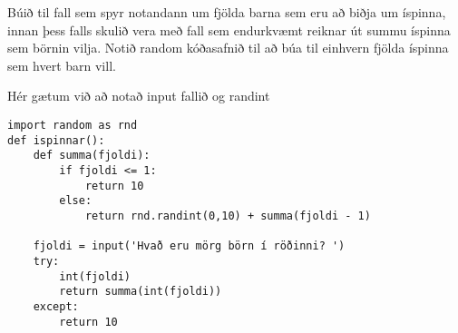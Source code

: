 \begin{exercise}\label{rei2}
Búið til fall sem spyr notandann um fjölda barna sem eru að biðja um íspinna, innan þess falls skulið vera með fall sem endurkvæmt reiknar út summu íspinna sem börnin vilja.
Notið random kóðasafnið til að búa til einhvern fjölda íspinna sem hvert barn vill.
\end{exercise}
\begin{Answer}[ref={rei2}]
Hér gætum við að notað input fallið og randint
	\begin{lstlisting}
import random as rnd
def ispinnar():
	def summa(fjoldi):
		if fjoldi <= 1:
			return 10
		else:
			return rnd.randint(0,10) + summa(fjoldi - 1)

	fjoldi = input('Hvað eru mörg börn í röðinni? ')
	try:
		int(fjoldi)
		return summa(int(fjoldi))
	except:
		return 10
	\end{lstlisting}
\end{Answer}